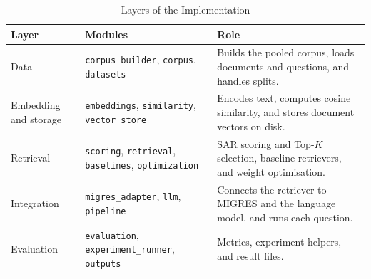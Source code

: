 \documentclass[12pt,a4paper]{report}
\begin{document}
\begin{table}[H]
\centering
\caption{Layers of the Implementation}
\label{tab:impl-layers}
\renewcommand{\arraystretch}{1.2}
\begin{tabular}{|p{1.45in}|p{2.05in}|p{2.55in}|}
\hline
\textbf{Layer} & \textbf{Modules} & \textbf{Role} \\ \hline
Data & \texttt{corpus\_builder}, \texttt{corpus}, \texttt{datasets} & Builds the pooled corpus, loads documents and questions, and handles splits. \\ \hline
Embedding and storage & \texttt{embeddings}, \texttt{similarity}, \texttt{vector\_store} & Encodes text, computes cosine similarity, and stores document vectors on disk. \\ \hline
Retrieval & \texttt{scoring}, \texttt{retrieval}, \texttt{baselines}, \texttt{optimization} & SAR scoring and Top-$K$ selection, baseline retrievers, and weight optimisation. \\ \hline
Integration & \texttt{migres\_adapter}, \texttt{llm}, \texttt{pipeline} & Connects the retriever to MIGRES and the language model, and runs each question. \\ \hline
Evaluation & \texttt{evaluation}, \texttt{experiment\_runner}, \texttt{outputs} & Metrics, experiment helpers, and result files. \\ \hline
\end{tabular}
\end{table}
\end{document}
